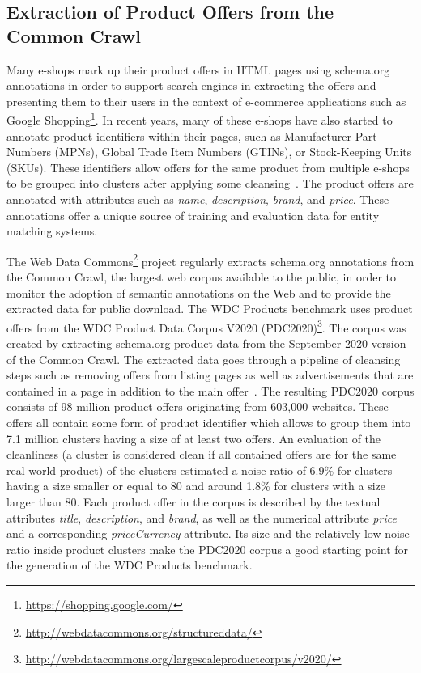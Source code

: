 \documentclass[sigconf,edbt]{acmart-edbt2024}
\begin{document}
\subsection{Extraction of Product Offers from the Common Crawl}
\label{subsec:extractionCC}

Many e-shops mark up their product offers in HTML pages using schema.org annotations in order to support search engines in extracting the offers and presenting them to their users in the context of e-commerce applications such as Google Shopping\footnote{\url{https://shopping.google.com/}}. In recent years, many of these e-shops have also started to annotate product identifiers within their pages, such as Manufacturer Part Numbers (MPNs), Global Trade
Item Numbers (GTINs), or Stock-Keeping Units (SKUs). These identifiers allow offers for the same product from multiple e-shops to be grouped into clusters after applying some cleansing~\cite{primpeli2019wdc}. The product offers are annotated with attributes such as \textit{name}, \textit{description}, \textit{brand}, and \textit{price}. These annotations offer a unique source of training and evaluation data for entity matching systems. 

The Web Data Commons\footnote{\url{http://webdatacommons.org/structureddata/}} project regularly extracts schema.org annotations from the Common Crawl, the largest web corpus available to the public, in order to monitor the adoption of semantic annotations on the Web and to provide the extracted data for public download.
The WDC Products benchmark uses product offers from the WDC Product Data Corpus V2020 (PDC2020)\footnote{\url{http://webdatacommons.org/largescaleproductcorpus/v2020/}}. The corpus was created by extracting schema.org product data from the September 2020 version of the Common Crawl. The extracted data goes through a pipeline of cleansing steps such as removing offers from listing pages as well as advertisements that are contained in a page in addition to the main offer~\cite{primpeli2019wdc}.  The resulting PDC2020 corpus consists of 98 million product offers originating from 603,000 websites. These offers all contain some form of product identifier which allows to group them into 7.1 million clusters having a size of at least two offers. An evaluation of the cleanliness (a cluster is considered clean if all contained offers are for the same real-world product) of the clusters estimated a noise ratio of 6.9\% for clusters having a size smaller or equal to 80 and around 1.8\% for clusters with a size larger than 80. Each product offer in the corpus is described by the textual attributes \textit{title}, \textit{description}, and \textit{brand}, as well as the numerical attribute \textit{price} and a corresponding \textit{priceCurrency} attribute. Its size and the relatively low noise ratio inside product clusters make the PDC2020 corpus a good starting point for the generation of the WDC Products benchmark. 
\end{document}
